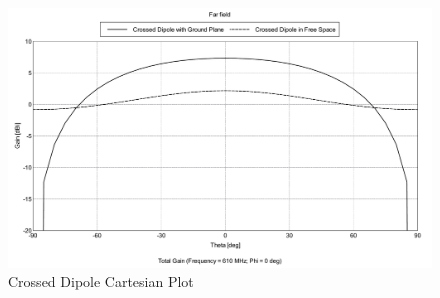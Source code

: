\documentclass[11pt]{witseiepaper}
\begin{document}
\begin{bibunit}[witseie]
\begin{figure}[htb]
    \centering
    \includegraphics[width=\linewidth]{Crossed-Dipole-Cartesian.pdf}
    \caption{Crossed Dipole Cartesian Plot}
    \label{fig:Crossed-Dipole-Radiation-Patterns-Cartesian}
\end{figure}






\end{bibunit}
\end{document}
